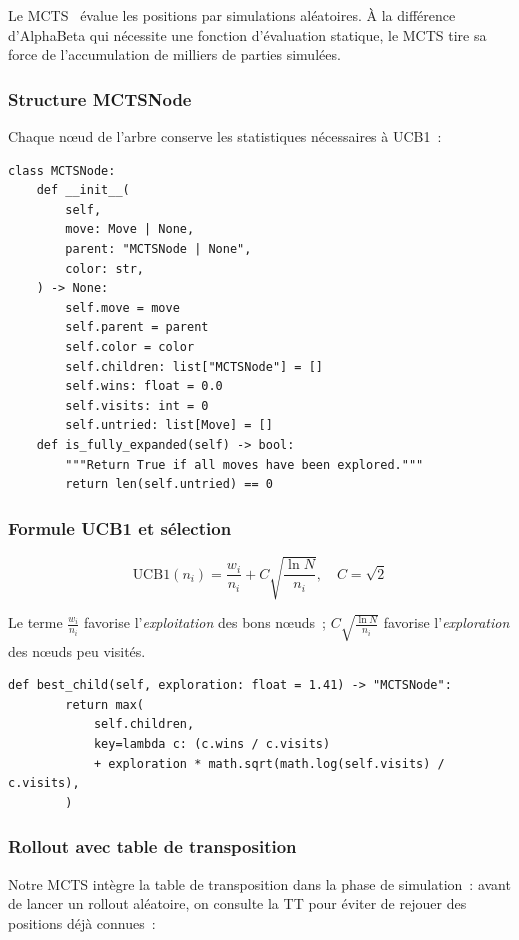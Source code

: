 \documentclass[a4paper,11pt]{article}
\begin{document}
Le MCTS~\cite{Browne2012} évalue les positions par simulations aléatoires.
À la différence d'AlphaBeta qui nécessite une fonction d'évaluation statique,
le MCTS tire sa force de l'accumulation de milliers de parties simulées.

\subsubsection{Structure MCTSNode}

Chaque nœud de l'arbre conserve les statistiques nécessaires à UCB1~:

\begin{verbatim}
class MCTSNode:
    def __init__(
        self,
        move: Move | None,
        parent: "MCTSNode | None",
        color: str,
    ) -> None:
        self.move = move
        self.parent = parent
        self.color = color
        self.children: list["MCTSNode"] = []
        self.wins: float = 0.0
        self.visits: int = 0
        self.untried: list[Move] = []
    def is_fully_expanded(self) -> bool:
        """Return True if all moves have been explored."""
        return len(self.untried) == 0
\end{verbatim}

\subsubsection{Formule UCB1 et sélection}

\[
  \text{UCB1}(n_i) = \frac{w_i}{n_i} + C\sqrt{\frac{\ln N}{n_i}},
  \quad C = \sqrt{2}
\]

Le terme $\frac{w_i}{n_i}$ favorise l'\emph{exploitation} des bons nœuds~;
$C\sqrt{\frac{\ln N}{n_i}}$ favorise l'\emph{exploration} des nœuds peu visités.

\begin{verbatim}
def best_child(self, exploration: float = 1.41) -> "MCTSNode":
        return max(
            self.children,
            key=lambda c: (c.wins / c.visits)
            + exploration * math.sqrt(math.log(self.visits) / c.visits),
        )
\end{verbatim}

\subsubsection{Rollout avec table de transposition}

Notre MCTS intègre la table de transposition dans la phase de simulation~:
avant de lancer un rollout aléatoire, on consulte la TT pour éviter de
rejouer des positions déjà connues~:
\end{document}
